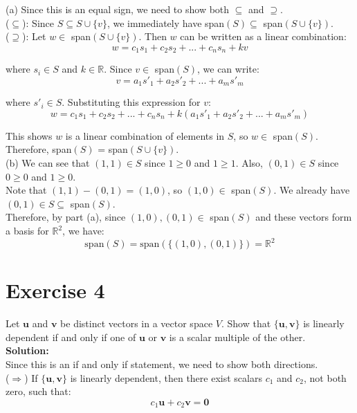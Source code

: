 \documentclass{article}
\begin{document}
(a) Since this is an equal sign, we need to show both $\subseteq$ and $\supseteq$. \\

($\subseteq$): Since $S \subseteq S \cup \{v\}$, we immediately have span$(S) \subseteq$ span$(S \cup \{v\})$. \\

($\supseteq$): Let $w \in$ span$(S \cup \{v\})$. Then $w$ can be written as a linear combination:
\[w = c_1s_1 + c_2s_2 + ... + c_ns_n + kv\]

where $s_i \in S$ and $k \in \mathbb{R}$. Since $v \in$ span$(S)$, we can write:
\[v = a_1s'_1 + a_2s'_2 + ... + a_ms'_m\]

where $s'_i \in S$. Substituting this expression for $v$:
\[w = c_1s_1 + c_2s_2 + ... + c_ns_n + k(a_1s'_1 + a_2s'_2 + ... + a_ms'_m)\]

This shows $w$ is a linear combination of elements in $S$, so $w \in$ span$(S)$. Therefore, span$(S)$ = span$(S \cup \{v\})$. \\

(b) We can see that $(1,1) \in S$ since $1 \geq 0$ and $1 \geq 1$.
Also, $(0,1) \in S$ since $0 \geq 0$ and $1 \geq 0$. \\

Note that $(1,1) - (0,1) = (1,0)$, so $(1,0) \in$ span$(S)$.
We already have $(0,1) \in S \subseteq$ span$(S)$. \\

Therefore, by part (a), since $(1,0), (0,1) \in$ span$(S)$ and these vectors form a basis for $\mathbb{R}^2$, we have:
\[\text{span}(S) = \text{span}(\{(1,0), (0,1)\}) = \mathbb{R}^2\]

\newpage

\section*{Exercise 4}
Let $\mathbf{u}$ and $\mathbf{v}$ be distinct vectors in a vector space $V$. Show that $\{\mathbf{u}, \mathbf{v}\}$ is linearly dependent if and only if one of $\mathbf{u}$ or $\mathbf{v}$ is a scalar multiple of the other. \\

\textbf{Solution:} \\

Since this is an if and only if statement, we need to show both directions. \\

($\Rightarrow$) If $\{\mathbf{u}, \mathbf{v}\}$ is linearly dependent, then there exist scalars $c_1$ and $c_2$, not both zero, such that:
\[c_1\mathbf{u} + c_2\mathbf{v} = \mathbf{0}\]
\end{document}
